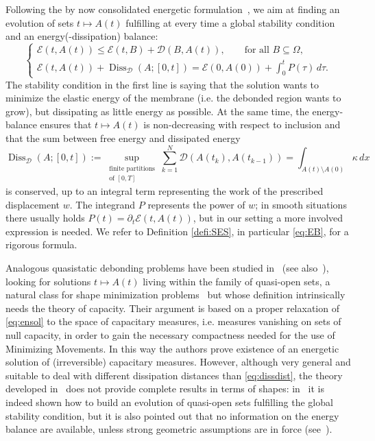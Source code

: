\documentclass[a4paper,11pt,reqno]{amsart}
\numberwithin{equation}{section}
\theoremstyle{definition}
\theoremstyle{remark}
\begin{document}
Following the by now consolidated energetic formulation~\cite{MielkeTheil}, we aim at finding an evolution of sets $t\mapsto A(t)$ fulfilling at every time a global stability condition and an energy(-dissipation) balance:
\begin{equation}\label{eq:ensol}
 \begin{cases}
    \displaystyle\mathcal E(t,A(t))\le \mathcal E(t,B)+\mathcal{D}(B,A(t)),\qquad\text{for all }B\subseteq \Omega,\\
    \displaystyle\mathcal E(t,A(t))+\operatorname{Diss}_{\mathcal D}(A;[0,t])=\mathcal E(0,A(0))+\int_0^t P(\tau)\,d\tau.
\end{cases}
\end{equation}
The stability condition in the first line is saying that the solution wants to minimize the elastic energy of the membrane (i.e. the debonded region wants to grow), but dissipating as little energy as possible. At the same time, the energy-balance ensures that $t\mapsto A(t)$ is non-decreasing with respect to inclusion and that the sum between free energy and dissipated energy
\begin{equation}
    \operatorname{Diss}_{\mathcal D}(A;[0,t]):=\sup\limits_{\substack{{\text{finite partitions}}\\{\text{of }[0,T]}}}\sum_{k=1}^N\mathcal D(A(t_k),A(t_{k-1}))=
         \int_{A(t)\setminus A(0)}\kappa\,dx
\end{equation}
is conserved, up to an integral term representing the work of the prescribed displacement $w$. The integrand $P$ represents the power of $w$; in smooth situations there usually holds $P(t)=\partial_t\mathcal E(t,A(t))$, but in our setting a more involved expression is needed. We refer to Definition \ref{defi:SES}, in particular \eqref{eq:EB}, for a rigorous formula.

Analogous quasistatic debonding problems have been studied in~\cite{BUCUR2008} (see also~\cite{BucButt}), looking for solutions $t\mapsto A(t)$ living within the family of quasi-open sets, a natural class for shape minimization problems~\cite{ButtazzoDM} but whose definition intrinsically needs the theory of capacity. Their argument is based on a proper relaxation of \eqref{eq:ensol} to the space of capacitary measures, i.e. measures vanishing on sets of null capacity, in order to gain the necessary compactness needed for the use of Minimizing Movements. In this way the authors prove existence of an energetic solution of (irreversible) capacitary measures. However, although very general and suitable to deal with different dissipation distances than \eqref{eq:dissdist}, the theory developed in~\cite{BUCUR2008} does not provide complete results in terms of shapes: in~\cite[Section 5]{BUCUR2008} it is indeed shown how to build an evolution of quasi-open sets fulfilling the global stability condition, but it is also pointed out that no information on the energy balance are available, unless strong geometric assumptions are in force (see~\cite[Remarks 3--4]{BUCUR2008}).
\end{document}
